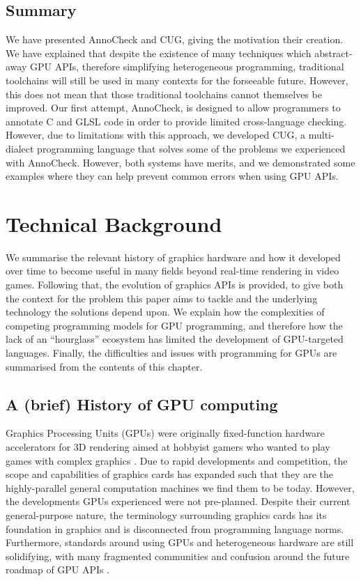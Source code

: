 \documentclass[a4paper,12pt,twoside,openright]{report}
\begin{document}
\section{Summary}

We have presented AnnoCheck and CUG, giving the motivation their creation. We
have explained that despite the existence of many techniques which
abstract-away GPU APIs, therefore simplifying heterogeneous programming,
traditional toolchains will still be used in many contexts for the forseeable
future. However, this does not mean that those traditional toolchains cannot
themselves be improved. Our first attempt, AnnoCheck, is designed to allow
programmers to annotate C and GLSL code in order to provide limited
cross-language checking. However, due to limitations with this approach, we
developed CUG, a multi-dialect programming language that solves some of the
problems we experienced with AnnoCheck. However, both systems have merits, and we
demonstrated some examples where they can help prevent common errors when using
GPU APIs.

\chapter{Technical Background}

\label{chp:technical_background}

We summarise the relevant history of graphics hardware and how it developed
over time to become useful in many fields beyond real-time rendering in video
games. Following that, the evolution of graphics APIs is provided, to give both
the context for the problem this paper aims to tackle and the underlying
technology the solutions depend upon. We explain how the complexities of
competing programming models for GPU programming, and therefore how the lack of
an ``hourglass'' ecosystem has limited the development of GPU-targeted
languages. Finally, the difficulties and issues with programming for GPUs are
summarised from the contents of this chapter.

\section{A (brief) History of GPU computing}

\label{sec:history_gpu}

Graphics Processing Units (GPUs) were originally fixed-function hardware
accelerators for 3D rendering aimed at hobbyist gamers who wanted to play games
with complex graphics \cite{GLQuake}. Due to rapid developments and
competition, the scope and capabilities of graphics cards has expanded such
that they are the highly-parallel general computation machines we find them to
be today. However, the developments GPUs experienced were not pre-planned.
Despite their current general-purpose nature, the terminology surrounding
graphics cards has its foundation in graphics and is disconnected from
programming language norms. Furthermore, standards around using GPUs and
heterogeneous hardware are still solidifying, with many fragmented communities
and confusion around the future roadmap of GPU APIs \cite{VulkanOpenCLMerge}
\cite{VulkanOpenCLNotMerge}.
\end{document}
